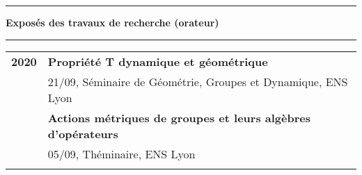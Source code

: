 \documentclass[a4paper,11pt]{article}
\newcommand{\titre}[1]{%
	\begin{center}
	\bigskip
	\rule{\textwidth}{1pt}
	\par\vspace{0.1cm}
        \textbf{\large #1}
	\par\rule{\textwidth}{1pt}
	\end{center}
	\bigskip
	}
\begin{document}
\newpage
\titre{Expos\'es des travaux de recherche (orateur)}

\begin{tabular}{cp{}}


\textbf{2020} 
                & \textbf{Propriété T dynamique et géométrique} \\ %
                & 21/09, Séminaire de Géométrie, Groupes et Dynamique, ENS Lyon \\
                & \textbf{Actions métriques de groupes et leurs algèbres d'opérateurs}\\  %
                & 05/09, Théminaire, ENS Lyon \\
\\


\end{tabular}
\end{document}
